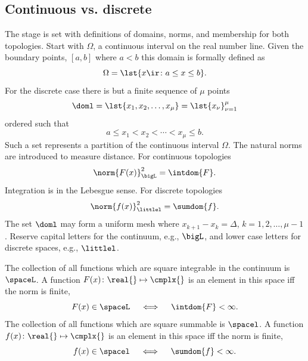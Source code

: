 \documentclass[conference]{worldcomp}
\begin{document}
\subsection{Continuous vs. discrete}  %
The stage is set with definitions of domains, norms, and membership for both topologies. Start with $\Omega$, a continuous interval on the real number line. Given the boundary points, $[a,b]$ where $a<b$ this domain is formally defined as
  \begin{equation}
    \Omega = \lst{x\ir\colon a \le x \le b}.
    \label{eq:domain:L}
  \end{equation}
For the discrete case there is but a finite sequence of $\mu$ points
  \begin{equation}
    \doml = \lst{x_{1}, x_{2}, \dots, x_{\mu}} = \lst{x_{\nu}}_{\nu=1}^{\mu} 
    \label{eq:domain:l}
  \end{equation}
ordered such that
  \begin{equation}
    a \le x_{1} < x_{2} < \cdots < x_{\mu} \le b .
  \end{equation}
Such a set represents a partition of the continuous interval $\Omega$.
The natural norms are introduced to measure distance. For continuous topologies
  \begin{equation}
    \norm{F(x)}_{\bigL}^{2} = \intdom{F} .
    \label{eq:norm:L}
  \end{equation}
Integration is in the Lebesgue sense. For discrete topologies
  \begin{equation}
    \norm{f(x)}_{\littlel}^{2} = \sumdom{f} .
    \label{eq:norm:l}
  \end{equation}
The set $\doml$ may form a uniform mesh where $x_{k+1} - x_{k} = \Delta$, $k=1,2,\dots,\mu-1$. Reserve capital letters for the continuum, e.g., $\bigL$, and lower case letters for discrete spaces, e.g., $\littlel$.

The collection of all functions which are square integrable in the continuum is $\spaceL$. A function $F(x)\colon \real{}  \mapsto \cmplx{}$ is an element in this space iff the norm is finite,
  \begin{equation}
    F(x) \in\spaceL \quad \iff \quad \intdom{F} < \infty.
    \label{eq:member:L}
  \end{equation}
The collection of all functions which are square summable is $\spacel$. A function $f(x)\colon \real{}  \mapsto \cmplx{}$ is an element in this space iff the norm is finite,
  \begin{equation}
    f(x) \in\spacel \quad \iff \quad \sumdom{f} < \infty.
    \label{eq:member:l}
  \end{equation}
\end{document}
